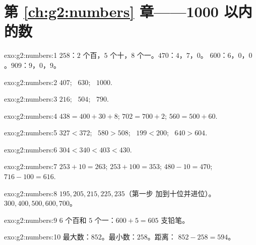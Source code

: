\section*{第 \ref{ch:g2:numbers} 章——1000 以内的数}

\begin{solution}{exo:g2:numbers:1}
$258$：$2$ 个百，$5$ 个十，$8$ 个一。$470$：$4$，$7$，$0$。
$600$：$6$，$0$，$0$。$909$：$9$，$0$，$9$。
\end{solution}

\begin{solution}{exo:g2:numbers:2}
$407$; \ $630$; \ $1000$.
\end{solution}

\begin{solution}{exo:g2:numbers:3}
$216$; \ $504$; \ $790$.
\end{solution}

\begin{solution}{exo:g2:numbers:4}
$438 = 400 + 30 + 8$; \quad $702 = 700 + 2$; \quad
$560 = 500 + 60$.
\end{solution}

\begin{solution}{exo:g2:numbers:5}
$327 < 372$; \ $580 > 508$; \ $199 < 200$; \ $640 > 604$.
\end{solution}

\begin{solution}{exo:g2:numbers:6}
$304 < 340 < 403 < 430$.
\end{solution}

\begin{solution}{exo:g2:numbers:7}
$253 + 10 = 263$; \quad $253 + 100 = 353$; \quad
$480 - 10 = 470$; \quad $716 - 100 = 616$.
\end{solution}

\begin{solution}{exo:g2:numbers:8}
$195, 205, 215, 225, 235$（第一步
加到十位并进位）。$300, 400, 500, 600, 700$。
\end{solution}

\begin{solution}{exo:g2:numbers:9}
$6$ 个百和 $5$ 个一：$600 + 5 = 605$ 支铅笔。
\end{solution}

\begin{solution}{exo:g2:numbers:10}
最大数：$852$。最小数：$258$。距离：
$852 - 258 = 594$。
\end{solution}

